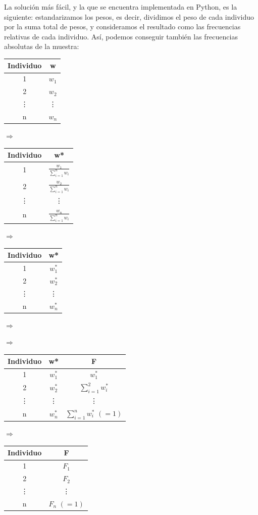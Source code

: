 \documentclass[12pt,twoside]{article}
\begin{document}
La solución más fácil, y la que se encuentra implementada en Python, es la siguiente: estandarizamos los pesos, es decir, dividimos el peso de cada individuo por la suma total de pesos, y consideramos el resultado como las frecuencias relativas de cada individuo. Así, podemos conseguir también las frecuencias absolutas de la muestra:
\begin{center}
\begin{tabular}{|c|c|}
\hline
Individuo & w \\ \hline
1 & $w_1$ \\ \hline
2 & $w_2$ \\ \hline
\vdots & \vdots \\ \hline
n & $w_n$ \\ \hline
\end{tabular}
$\Rightarrow$
\begin{tabular}{|c|c|}
\hline
Individuo & w* \\ \hline
1 & $\frac{w_1}{\sum_{i=1}^n w_i}$ \\ \hline
2 & $\frac{w_2}{\sum_{i=1}^n w_i}$ \\ \hline
\vdots & \vdots \\ \hline
n & $\frac{w_n}{\sum_{i=1}^n w_i}$ \\ \hline
\end{tabular}
$\Rightarrow$
\begin{tabular}{|c|c|}
\hline
Individuo & w* \\ \hline
1 & $w_1^*$ \\ \hline
2 & $w_2^*$ \\ \hline
\vdots & \vdots \\ \hline
n & $w_n^*$ \\ \hline
\end{tabular}
$\Rightarrow$
\end{center}
\begin{center}
$\Rightarrow$
\begin{tabular}{|c|c|c|}
\hline
Individuo & w* & F\\ \hline
1 & $w_1^*$ & $w_1^*$ \\ \hline
2 & $w_2^*$ & $\displaystyle \sum_{i=1}^2 w_i^*$ \\ \hline
\vdots & \vdots & \vdots \\ \hline
n & $w_n^*$ & $\displaystyle \sum_{i=1}^n w_i^* \, \, (= 1)$ \\ \hline
\end{tabular}
$\Rightarrow$
\begin{tabular}{|c|c|}
\hline
Individuo & F \\ \hline
1 & $F_1$ \\ \hline
2 & $F_2$ \\ \hline
\vdots & \vdots \\ \hline
n & $F_n \, \, (=1)$ \\ \hline
\end{tabular}
\end{center}
\end{document}
